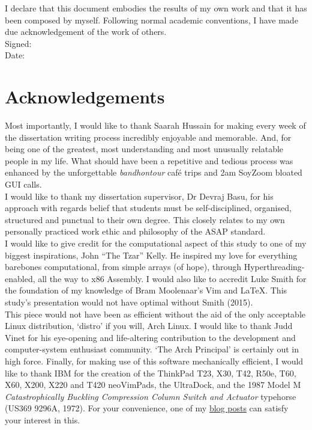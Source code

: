 \documentclass[11pt, english]{article}
\begin{document}
	I declare that this document embodies the results of my own work and that it has been composed by myself. Following normal academic conventions, I have made due acknowledgement of the work of others.\\

	Signed:\\ 

	Date:

\newpage

	\section*{Acknowledgements}

	Most importantly, I would like to thank Saarah Hussain for making every week of the dissertation writing process incredibly enjoyable and memorable. And, for being one of the greatest, most understanding and most unusually relatable people in my life. What should have been a repetitive and tedious process was enhanced by the unforgettable \textit{bandhontour} caf\'{e} trips and 2am SoyZoom bloated GUI calls.\\

I would like to thank my dissertation supervisor, Dr Devraj Basu, for his approach with regards belief that students must be self-disciplined, organised, structured and punctual to their own degree. This closely relates to my own personally practiced work ethic and philosophy of the ASAP standard.\\

I would like to give credit for the computational aspect of this study to one of my biggest inspirations, John ``The Tzar'' Kelly. He inspired my love for everything barebones computational, from simple arrays (of hope), through Hyperthreading-enabled, all the way to x86 Assembly. I would also like to accredit Luke Smith for the foundation of my knowledge of Bram Moolenaar’s Vim and {\LaTeX}. This study’s presentation would not have optimal without Smith (2015).\\

This piece would not have been as efficient without the aid of the only acceptable Linux distribution, `distro’ if you will, Arch Linux. I would like to thank Judd Vinet for his eye-opening and life-altering contribution to the development and computer-system enthusiast community. ‘The Arch Principal’ is certainly out in high force. Finally, for making use of this software mechanically efficient, I would like to thank IBM for the creation of the ThinkPad T23, X30, T42, R50e, T60, X60, X200, X220 and T420 neoVimPads, the UltraDock, and the 1987 Model M \textit{Catastrophically Buckling Compression Column Switch and Actuator} typehorse (US369 9296A, 1972). For your convenience, one of my \href{http://lewisbritton.com/Blog/ThinkFlow.html}{blog posts} can satisfy your interest in this. 
\end{document}
